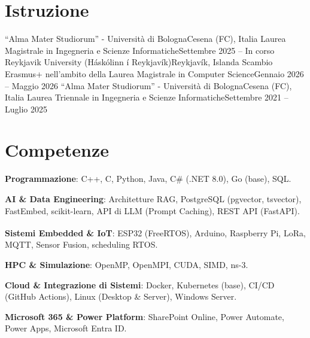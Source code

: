 \documentclass[letterpaper,11pt,italian]{article}
\begin{document}
\section{Istruzione}
\resumeSubHeadingListStart
\resumeSubheading
{``Alma Mater Studiorum'' - Università di Bologna}{Cesena (FC), Italia}
{Laurea Magistrale in Ingegneria e Scienze Informatiche}{Settembre 2025 -- In corso}
\resumeSubheading
{Reykjavik University (H\'ask\'olinn \'i Reykjav\'ik)}{Reykjavík, Islanda}
{Scambio Erasmus+ nell'ambito della Laurea Magistrale in Computer Science}{Gennaio 2026 -- Maggio 2026}
\resumeItemListStart
{}
\resumeItemListEnd
\resumeSubheading
{``Alma Mater Studiorum'' - Università di Bologna}{Cesena (FC), Italia}
{Laurea Triennale in Ingegneria e Scienze Informatiche}{Settembre 2021 -- Luglio 2025}
\resumeItemListStart
{}
\resumeItemListEnd
\resumeSubHeadingListEnd

\section{Competenze}
\resumeSubHeadingListStart
\item{
            \textbf{Programmazione}{: C++, C, Python, Java, C\# (.NET 8.0), Go (base), SQL.}
            \hfill
      }
\item{
            \textbf{AI \& Data Engineering}{: Architetture RAG, PostgreSQL (pgvector, tsvector), FastEmbed, scikit-learn, API di LLM (Prompt Caching), REST API (FastAPI).}
            \hfill
      }
\item{
            \textbf{Sistemi Embedded \& IoT}{: ESP32 (FreeRTOS), Arduino, Raspberry Pi, LoRa\textsuperscript{\textcopyright}, MQTT, Sensor Fusion, scheduling RTOS.}
            \hfill
      }
\item{
            \textbf{HPC \& Simulazione}{: OpenMP, OpenMPI, CUDA, SIMD, ns-3.}
            \hfill
      }
\item{
            \textbf{Cloud \& Integrazione di Sistemi}{: Docker, Kubernetes (base), CI/CD (GitHub Actions), Linux (Desktop \& Server), Windows Server.}
            \hfill
      }
\item{
            \textbf{Microsoft 365 \& Power Platform}{: SharePoint Online, Power Automate, Power Apps, Microsoft Entra ID.}
            \hfill
      }
\resumeSubHeadingListEnd
\end{document}
